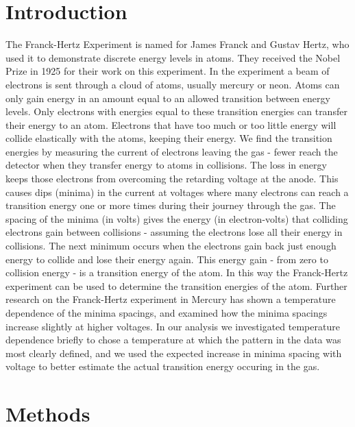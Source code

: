 \documentclass[prb,preprint]{revtex4-1}
\begin{document}
\section{Introduction} 

The Franck-Hertz Experiment is named for James Franck and Gustav Hertz, who used it to demonstrate discrete energy levels in atoms. 
They received the Nobel Prize in 1925 for their work on this experiment. 
In the experiment a beam of electrons is sent through a cloud of atoms, usually mercury or neon. 
Atoms can only gain energy in an amount equal to an allowed transition between energy levels. 
Only electrons with energies equal to these transition energies can transfer their energy to an atom. 
Electrons that have too much or too little energy will collide elastically with the atoms, keeping their energy. 
We find the transition energies by measuring the current of electrons leaving the gas - fewer reach the detector when they transfer energy to atoms in collisions. 
The loss in energy keeps those electrons from overcoming the retarding voltage at the anode. 
This causes dips (minima) in the current at voltages where many electrons can reach a transition energy one or more times during their journey through the gas. 
The spacing of the minima (in volts) gives the energy (in electron-volts) that colliding electrons gain between collisions - assuming the electrons lose all their energy in collisions. 
The next minimum occurs when the electrons gain back just enough energy to collide and lose their energy again. 
This energy gain - from zero to collision energy - is a transition energy of the atom. 
In this way the Franck-Hertz experiment can be used to determine the transition energies of the atom. 
Further research on the Franck-Hertz experiment in Mercury has shown a temperature dependence of the minima spacings, and examined how the minima spacings increase slightly at higher voltages. 
In our analysis we investigated temperature dependence briefly to chose a temperature at which the pattern in the data was most clearly defined, and we used the expected increase in minima spacing with voltage to better estimate the actual transition energy occuring in the gas. 


\section{Methods}
\end{document}
